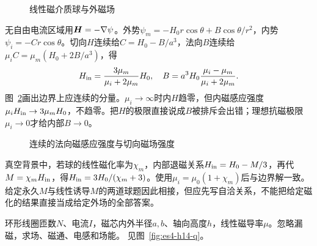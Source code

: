 \begin{figure}[H]\centering
{}
\caption{线性磁介质球与外磁场}\label{fig:es4-h13-q}
\end{figure}
\begin{solution}
无自由电流区域用$\bm{H}=-\nabla\psi$。外势$\psi_m=-H_0r\cos\theta+B\cos\theta/r^2$，内势$\psi_i=-Cr\cos\theta$。切向$H$连续给$C=H_0-B/a^3$，法向$B$连续给$\mu_iC=\mu_m(H_0+2B/a^3)$，得
\[H_{\rm in}=\frac{3\mu_m}{\mu_i+2\mu_m}H_0,\quad B=a^3H_0\frac{\mu_i-\mu_m}{\mu_i+2\mu_m}.
\]
图~\ref{fig:es4-h13-s}画出边界上应连续的分量。$\mu_i\to\infty$时内$H$趋零，但内磁感应强度$\mu_iH_{\rm in}\to3\mu_mH_0$，不趋零。把$H$的极限直接说成$B$被排斥会出错；理想抗磁极限$\mu_i\to0$才给内部$B\to0$。
\begin{figure}[H]\centering
{}
\caption{连续的法向磁感应强度与切向磁场强度}\label{fig:es4-h13-s}
\end{figure}


真空背景中，若球的线性磁化率为$\chi_m$，内部退磁关系$H_{\rm in}=H_0-M/3$，再代$M=\chi_mH_{\rm in}$，得$H_{\rm in}=3H_0/(\chi_m+3)$。使用$\mu_i=\mu_0(1+\chi_m)$后与边界解一致。给定永久$M$与线性诱导$M$的两道球题因此相接，但应先写自洽关系，不能把给定磁化的结果直接当成给定外场的全部答案。
\end{solution}

\begin{exercise}[矩形截面环形磁芯的电感]\label{ex:es4-h14}
环形线圈匝数$N$、电流$I$，磁芯内外半径$a,b$、轴向高度$h$，线性磁导率$\mu$。忽略漏磁，求场、磁通、电感和场能。 见图~\ref{fig:es4-h14-q}。
\end{exercise}


